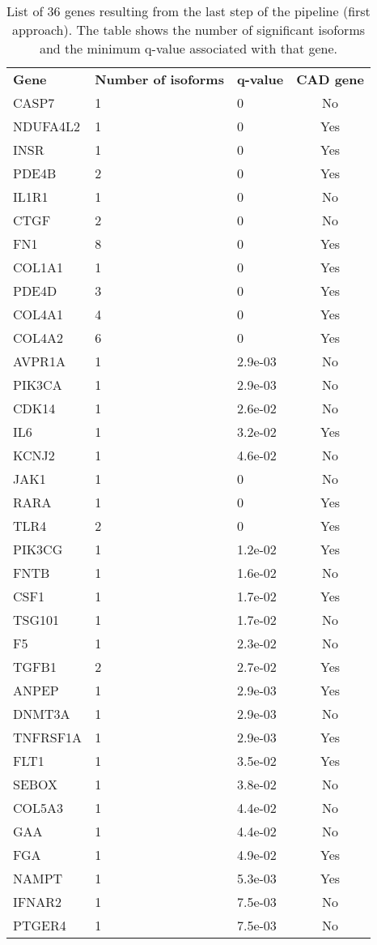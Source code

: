 \documentclass[fleqn,10pt]{SelfArx} %
\begin{document}
\renewcommand{\arraystretch}{1.1}
\begin{table}[!t]
	\centering
	\begin{tabularx}{\linewidth}{lRRc}
		\textbf{\color{white} Gene} & \textbf{\color{white} Number of isoforms} & \textbf{\color{white} q-value} & \textbf{\color{white}
			CAD gene}\\
	CASP7 &   1 & 0 & No \\ 
	NDUFA4L2 &   1 & 0 & Yes \\ 
	INSR &   1 & 0 & Yes \\ 
	PDE4B &   2 & 0 & Yes \\ 
	IL1R1 &   1 & 0 & No \\ 
	CTGF &   2 & 0 & No \\ 
	FN1 &   8 & 0 & Yes \\ 
	COL1A1 &   1 & 0 & Yes \\ 
	PDE4D &   3 & 0 & Yes \\ 
	COL4A1 &   4 & 0 & Yes \\ 
	COL4A2 &   6 & 0 & Yes \\ 
	AVPR1A &   1 & 2.9e-03 & No \\ 
	PIK3CA &   1 & 2.9e-03 & No \\ 
	CDK14 &   1 & 2.6e-02 & No \\ 
	IL6 &   1 & 3.2e-02 & Yes \\ 
	KCNJ2 &   1 & 4.6e-02 & No \\
	\hline 
	JAK1 &   1 & 0 & No \\ 
	RARA &   1 & 0 & Yes \\ 
	TLR4 &   2 & 0 & Yes \\ 
	PIK3CG &   1 & 1.2e-02 & Yes \\ 
	FNTB &   1 & 1.6e-02 & No \\ 
	CSF1 &   1 & 1.7e-02 & Yes \\ 
	TSG101 &   1 & 1.7e-02 & No \\ 
	F5 &   1 & 2.3e-02 & No \\ 
	TGFB1 &   2 & 2.7e-02 & Yes \\ 
	ANPEP &   1 & 2.9e-03 & Yes \\ 
	DNMT3A &   1 & 2.9e-03 & No \\ 
	TNFRSF1A &   1 & 2.9e-03 & Yes \\ 
	FLT1 &   1 & 3.5e-02 & Yes \\ 
	SEBOX &   1 & 3.8e-02 & No \\ 
	COL5A3 &   1 & 4.4e-02 & No \\ 
	GAA &   1 & 4.4e-02 & No \\ 
	FGA &   1 & 4.9e-02 & Yes \\ 
	NAMPT &   1 & 5.3e-03 & Yes \\ 
	IFNAR2 &   1 & 7.5e-03 & No \\ 
	PTGER4 &   1 & 7.5e-03 & No \\ 
	\end{tabularx}
	\smallskip
	\caption{List of 36 genes resulting from the last step of the pipeline (first approach). The table shows the number of significant isoforms and the minimum q-value associated with that gene.}
	\label{tab:sign36}
\end{table}
\end{document}
